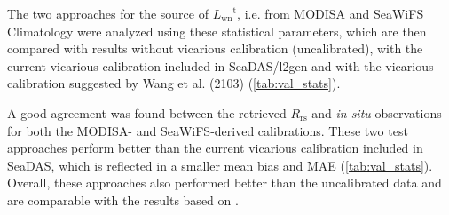 \documentclass[]{interact}
\theoremstyle{plain}%
\theoremstyle{definition}
\theoremstyle{remark}
\begin{document}
The two approaches for the source of ${L_\text{wn}}^\text{t}$, i.e. from MODISA and SeaWiFS Climatology were analyzed using these statistical parameters, which are then compared with results without vicarious calibration (uncalibrated), with the current vicarious calibration included in SeaDAS/l2gen and with the vicarious calibration suggested by Wang et al. (2103) \citep{Wang:13} (\autoref{tab:val_stats}).

A good agreement was found between the retrieved $R_\text{rs}$ and {\it in situ} observations for both the MODISA- and SeaWiFS-derived calibrations. These two test approaches perform better than the current vicarious calibration included in SeaDAS, which is reflected in a smaller mean bias and MAE (\autoref{tab:val_stats}). Overall, these approaches also performed better than the uncalibrated data and are comparable with the results based on \citep{Wang:13}.
\end{document}
